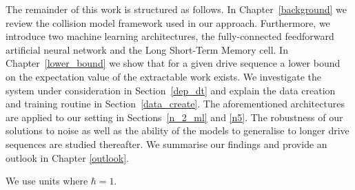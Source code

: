 The remainder of this work is structured as follows.
In Chapter~\ref{background} we review the collision model framework used in our approach.
Furthermore, we introduce two machine learning architectures, the fully-connected feedforward artificial neural network and the Long Short-Term Memory cell.
In Chapter~\ref{lower_bound} we show that for a given drive sequence a lower bound on the expectation value of the extractable work exists.
We investigate the system under consideration in Section~\ref{dep_dt} and explain the data creation and training routine in Section~\ref{data_create}.
The aforementioned architectures are applied to our setting in Sections~\ref{n_2_ml} and \ref{n5}.
The robustness of our solutions to noise as well as the ability of the models to generalise to longer drive sequences are studied thereafter.
We summarise our findings and provide an outlook in Chapter \ref{outlook}.

We use units where $\hbar = 1$.